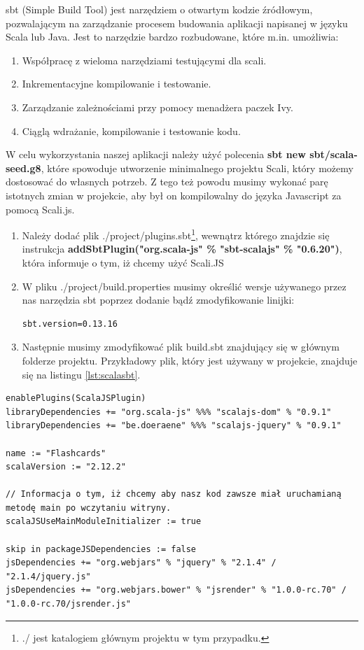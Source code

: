 sbt (Simple Build Tool) jest narzędziem o otwartym kodzie źródłowym, pozwalającym na zarządzanie procesem budowania aplikacji napisanej w języku Scala lub Java. Jest to narzędzie bardzo rozbudowane, które m.in. umożliwia:
\begin{enumerate}
	\item Współpracę z wieloma narzędziami testującymi dla scali.
	\item Inkrementacyjne kompilowanie i testowanie.
	\item Zarządzanie zależnościami przy pomocy menadżera paczek Ivy.\cite{ApacheIvy}
	\item Ciąglą wdrażanie, kompilowanie i testowanie kodu.
\end{enumerate}

\hline{2cm}

W celu wykorzystania naszej aplikacji należy użyć polecenia \textbf{sbt new sbt/scala-seed.g8}, które spowoduje utworzenie minimalnego projektu Scali, który możemy dostosować do własnych potrzeb.
Z tego też powodu musimy wykonać parę istotnych zmian w projekcie, aby był on kompilowalny do języka Javascript za pomocą Scali.js.

\begin{enumerate}
	\item Należy dodać plik ./project/plugins.sbt\footnote{./ jest katalogiem głównym projektu w tym przypadku.}, wewnątrz którego znajdzie się instrukcja \textbf{addSbtPlugin("org.scala-js" \% "sbt-scalajs" \% "0.6.20")}, która informuje o tym, iż chcemy użyć Scali.JS
	\item W pliku ./project/build.properties musimy określić wersje używanego przez nas narzędzia sbt poprzez dodanie bądź zmodyfikowanie linijki: 
	\begin{lstlisting}[numbers = none]
		sbt.version=0.13.16
	\end{lstlisting}
	\item Następnie musimy zmodyfikować plik build.sbt znajdujący się w głównym folderze projektu. Przykładowy plik, który jest używany w projekcie, znajduje się na listingu \ref{lst:scalasbt}.
\end{enumerate}


\begin{lstlisting}[label={lst:scalasbt},
frame=single, numbers=none,captionpos=b, 
caption={Plik .sbt, który jest wykorzystywany w projekcie.}]
enablePlugins(ScalaJSPlugin)
libraryDependencies += "org.scala-js" %%% "scalajs-dom" % "0.9.1"
libraryDependencies += "be.doeraene" %%% "scalajs-jquery" % "0.9.1"

name := "Flashcards"
scalaVersion := "2.12.2"

// Informacja o tym, iż chcemy aby nasz kod zawsze miał uruchamianą metodę main po wczytaniu witryny.
scalaJSUseMainModuleInitializer := true

skip in packageJSDependencies := false
jsDependencies += "org.webjars" % "jquery" % "2.1.4" / "2.1.4/jquery.js" 
jsDependencies += "org.webjars.bower" % "jsrender" % "1.0.0-rc.70" / "1.0.0-rc.70/jsrender.js"
\end{lstlisting}

